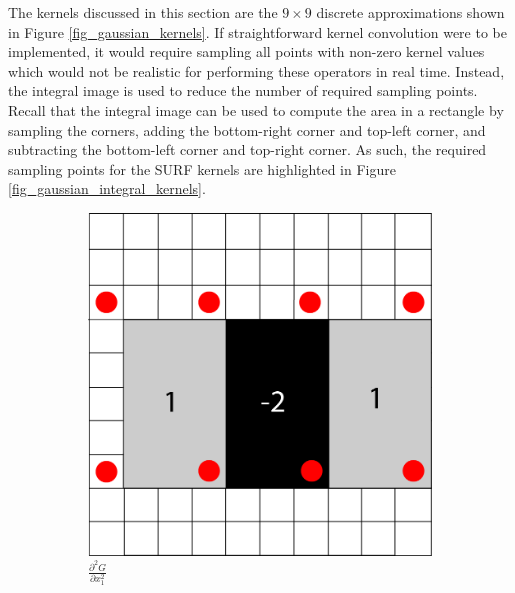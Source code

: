 \documentclass[sigconf]{acmart/acmart}
\begin{document}
The kernels discussed in this section are the $9 \times 9$ discrete approximations shown in Figure \ref{fig_gaussian_kernels}. If straightforward kernel convolution were to be implemented, it would require sampling all points with non-zero kernel values which would not be realistic for performing these operators in real time. Instead, the integral image is used to reduce the number of required sampling points. Recall that the integral image can be used to compute the area in a rectangle by sampling the corners, adding the bottom-right corner and top-left corner, and subtracting the bottom-left corner and top-right corner. As such, the required sampling points for the SURF kernels are highlighted in Figure \ref{fig_gaussian_integral_kernels}.

\begin{figure}[h]
	\centering
	\begin{subfigure}[b]{0.3\textwidth}
		\centering
		\includegraphics[width=\textwidth]{figures/hessian/gaussian_second_order_kernel_xx_integral}
		\caption{$\frac{\partial^2 G}{\partial x_1^2}$}
	\end{subfigure}
	\begin{subfigure}[b]{0.3\textwidth}
		\centering

\end{subfigure}
\end{figure}
\end{document}
